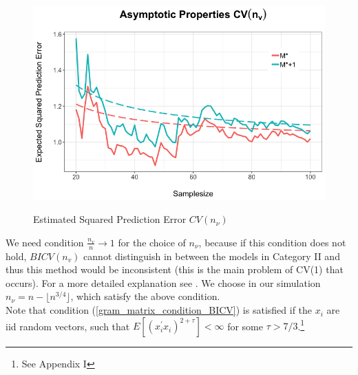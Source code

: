 \documentclass[Research_Module_ES.tex]{subfiles}
\begin{document}
\begin{figure}[!h]
	\label{ProofSektchCVn_v}
	\centering
	\includegraphics[width=1\textwidth]{ProofSketchNV.png}\\
	\caption{Estimated Squared Prediction Error $CV(n_\nu)$}
\end{figure}
We need condition $\frac{n_v}{n}\to 1$ for the choice of $n_\nu$, because if this condition does not hold, $BICV(n_v)$ cannot distinguish in between the models in Category II and thus this method would be inconsistent (this is the main problem of CV(1) that occurs). For a more detailed explanation see \cite{shao}. We choose in our simulation $n_\nu=n-\lfloor n^{3/4}\rfloor$, which satisfy the above condition.\\

Note that condition (\ref{gram_matrix_condition_BICV}) is satisfied if the $x_i$ are iid random vectors, such that $E[(x_i^\prime x_i)^{2+\tau}]<\infty$ for some $\tau>7/3$.\footnote{See Appendix I}
\end{document}
